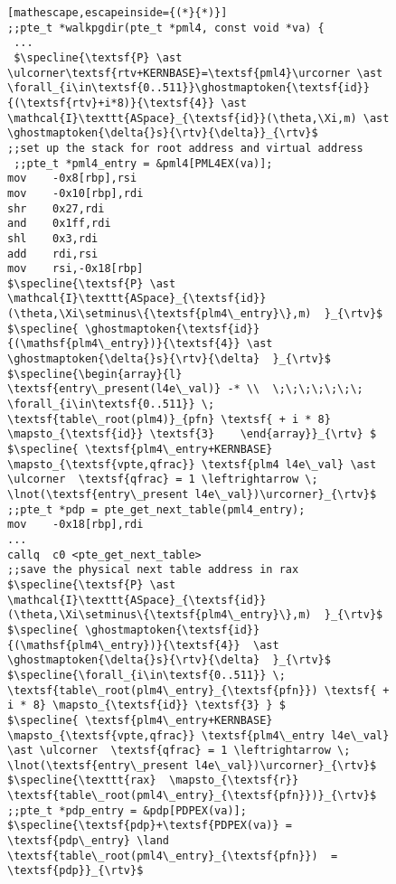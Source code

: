 \begin{figure}\footnotesize
\begin{lstlisting}[mathescape,escapeinside={(*}{*)}]
;;pte_t *walkpgdir(pte_t *pml4, const void *va) {
 ...
 $\specline{\textsf{P} \ast \ulcorner\textsf{rtv+KERNBASE}=\textsf{pml4}\urcorner \ast \forall_{i\in\textsf{0..511}}\ghostmaptoken{\textsf{id}}{(\textsf{rtv}+i*8)}{\textsf{4}} \ast \mathcal{I}\texttt{ASpace}_{\textsf{id}}(\theta,\Xi,m) \ast \ghostmaptoken{\delta{}s}{\rtv}{\delta}}_{\rtv}$
;;set up the stack for root address and virtual address    
 ;;pte_t *pml4_entry = &pml4[PML4EX(va)];
mov    -0x8[rbp],rsi
mov    -0x10[rbp],rdi
shr    0x27,rdi
and    0x1ff,rdi
shl    0x3,rdi
add    rdi,rsi
mov    rsi,-0x18[rbp]
$\specline{\textsf{P} \ast \mathcal{I}\texttt{ASpace}_{\textsf{id}}(\theta,\Xi\setminus\{\textsf{plm4\_entry}\},m)  }_{\rtv}$
$\specline{ \ghostmaptoken{\textsf{id}}{(\mathsf{plm4\_entry})}{\textsf{4}} \ast \ghostmaptoken{\delta{}s}{\rtv}{\delta}  }_{\rtv}$
$\specline{\begin{array}{l} \textsf{entry\_present(l4e\_val)} -* \\  \;\;\;\;\;\;\; \forall_{i\in\textsf{0..511}} \; \textsf{table\_root(plm4)}_{pfn} \textsf{ + i * 8} \mapsto_{\textsf{id}} \textsf{3}    \end{array}}_{\rtv} $
$\specline{ \textsf{plm4\_entry+KERNBASE} \mapsto_{\textsf{vpte,qfrac}} \textsf{plm4 l4e\_val} \ast \ulcorner  \textsf{qfrac} = 1 \leftrightarrow \; \lnot(\textsf{entry\_present l4e\_val})\urcorner}_{\rtv}$    
;;pte_t *pdp = pte_get_next_table(pml4_entry);
mov    -0x18[rbp],rdi
...
callq  c0 <pte_get_next_table>
;;save the physical next table address in rax
$\specline{\textsf{P} \ast \mathcal{I}\texttt{ASpace}_{\textsf{id}}(\theta,\Xi\setminus\{\textsf{plm4\_entry}\},m)  }_{\rtv}$
$\specline{ \ghostmaptoken{\textsf{id}}{(\mathsf{plm4\_entry})}{\textsf{4}}  \ast \ghostmaptoken{\delta{}s}{\rtv}{\delta}  }_{\rtv}$
$\specline{\forall_{i\in\textsf{0..511}} \; \textsf{table\_root(plm4\_entry}_{\textsf{pfn}}) \textsf{ + i * 8} \mapsto_{\textsf{id}} \textsf{3} } $
$\specline{ \textsf{plm4\_entry+KERNBASE} \mapsto_{\textsf{vpte,qfrac}} \textsf{plm4\_entry l4e\_val} \ast \ulcorner  \textsf{qfrac} = 1 \leftrightarrow \; \lnot(\textsf{entry\_present l4e\_val})\urcorner}_{\rtv}$
$\specline{\texttt{rax}  \mapsto_{\textsf{r}} \textsf{table\_root(pml4\_entry}_{\textsf{pfn}})}_{\rtv}$
;;pte_t *pdp_entry = &pdp[PDPEX(va)];
$\specline{\textsf{pdp}+\textsf{PDPEX(va)} = \textsf{pdp\_entry} \land \textsf{table\_root(pml4\_entry}_{\textsf{pfn}})  = \textsf{pdp}}_{\rtv}$

\end{lstlisting}
\end{figure}
